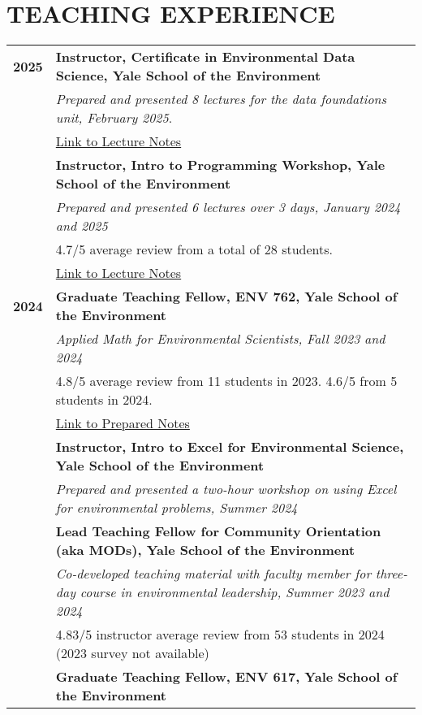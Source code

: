 \documentclass[11pt]{article}
\begin{document}
\section*{TEACHING EXPERIENCE}
\begin{longtable}{>{\bfseries}r p{5.5in}}%
2025 & \textbf{Instructor, Certificate in Environmental Data Science, Yale School of the Environment} \\
    & \textit{Prepared and presented 8 lectures for the data foundations unit, February 2025}.\\ 
    & \href{https://github.com/a5creel/yse_data_science_certificate}{Link to Lecture Notes} \\[1ex]
    & \textbf{Instructor, Intro to Programming Workshop, Yale School of the Environment} \\
    & \textit{Prepared and presented 6 lectures over 3 days, January 2024 and 2025} \\
    & 4.7/5 average review from a total of 28 students.\\
    &  \href{https://github.com/a5creel/intro_to_programming}{Link to Lecture Notes}  \\[1ex]
2024 & \textbf{Graduate Teaching Fellow, ENV 762, Yale School of the Environment} \\
    & \textit{Applied Math for Environmental Scientists, Fall 2023 and 2024} \\
    & 4.8/5 average review from 11 students in 2023. 4.6/5 from 5 students in 2024. \\
    & \href{https://github.com/a5creel/AMES}{Link to Prepared Notes} \\[1ex]    
    & \textbf{Instructor, Intro to Excel for Environmental Science, Yale School of the Environment} \\
    & \textit{Prepared and presented a two-hour workshop on using Excel for environmental problems, Summer 2024} \\[1ex]
    & \textbf{Lead Teaching Fellow for Community Orientation (aka MODs), Yale School of the Environment} \\
    & \textit{Co-developed teaching material with faculty member for three-day course in environmental leadership, Summer 2023 and 2024} \\
    & 4.83/5 instructor average review from 53 students in 2024 (2023 survey not available) \\[1ex]
    & \textbf{Graduate Teaching Fellow, ENV 617, Yale School of the Environment} \\

\end{longtable}
\end{document}
